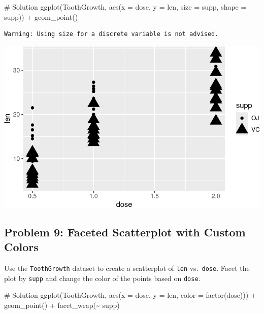 \documentclass[
  letterpaper,
  DIV=11,
  numbers=noendperiod]{scrreprt}
\newenvironment{Shaded}{\begin{snugshade}}{\end{snugshade}}
\newcommand{\AttributeTok}[1]{\textcolor[rgb]{0.40,0.45,0.13}{#1}}
\newcommand{\CommentTok}[1]{\textcolor[rgb]{0.37,0.37,0.37}{#1}}
\newcommand{\FunctionTok}[1]{\textcolor[rgb]{0.28,0.35,0.67}{#1}}
\newcommand{\NormalTok}[1]{\textcolor[rgb]{0.00,0.23,0.31}{#1}}
\newcommand{\SpecialCharTok}[1]{\textcolor[rgb]{0.37,0.37,0.37}{#1}}
\begin{document}
\begin{Shaded}
\begin{Highlighting}[]
\CommentTok{\# Solution}
\FunctionTok{ggplot}\NormalTok{(ToothGrowth, }\FunctionTok{aes}\NormalTok{(}\AttributeTok{x =}\NormalTok{ dose, }\AttributeTok{y =}\NormalTok{ len, }\AttributeTok{size =}\NormalTok{ supp, }\AttributeTok{shape =}\NormalTok{ supp)) }\SpecialCharTok{+}
  \FunctionTok{geom\_point}\NormalTok{()}
\end{Highlighting}
\end{Shaded}

\begin{verbatim}
Warning: Using size for a discrete variable is not advised.
\end{verbatim}

\includegraphics{Advanced_Scatterplot_Techniques_files/figure-pdf/unnamed-chunk-27-1.pdf}

\subsection*{Problem 9: Faceted Scatterplot with Custom
Colors}\label{problem-9-faceted-scatterplot-with-custom-colors}

Use the \texttt{ToothGrowth} dataset to create a scatterplot of
\texttt{len} vs.~\texttt{dose}. Facet the plot by \texttt{supp} and
change the color of the points based on \texttt{dose}.

\begin{Shaded}
\begin{Highlighting}[]
\CommentTok{\# Solution}
\FunctionTok{ggplot}\NormalTok{(ToothGrowth, }\FunctionTok{aes}\NormalTok{(}\AttributeTok{x =}\NormalTok{ dose, }\AttributeTok{y =}\NormalTok{ len, }\AttributeTok{color =} \FunctionTok{factor}\NormalTok{(dose))) }\SpecialCharTok{+}
  \FunctionTok{geom\_point}\NormalTok{() }\SpecialCharTok{+}
  \FunctionTok{facet\_wrap}\NormalTok{(}\SpecialCharTok{\textasciitilde{}}\NormalTok{ supp)}
\end{Highlighting}
\end{Shaded}
\end{document}
